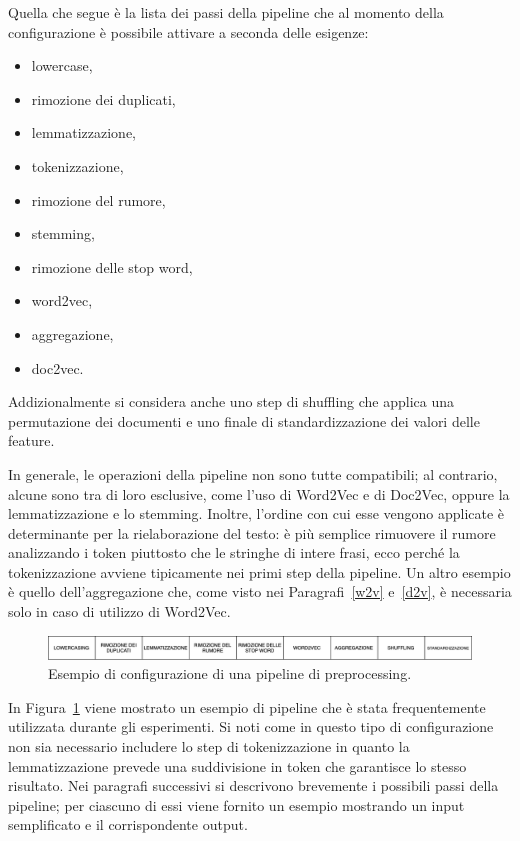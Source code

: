 \documentclass[12pt]{report}
\theoremstyle{definition}
\begin{document}
Quella che segue è la lista dei passi della pipeline che al momento della configurazione è possibile attivare a seconda delle esigenze:
\begin{itemize}
    \item lowercase,
    \item rimozione dei duplicati,
    \item lemmatizzazione,
    \item tokenizzazione,
    \item rimozione del rumore,
    \item stemming,
    \item rimozione delle stop word,
    \item word2vec,
    \item aggregazione,
    \item doc2vec.
\end{itemize}
Addizionalmente si considera anche uno step di shuffling che applica una permutazione dei documenti e uno finale di standardizzazione dei valori delle feature.

In generale, le operazioni della pipeline non sono tutte compatibili; al contrario, alcune sono tra di loro esclusive, come l'uso di Word2Vec e di Doc2Vec, oppure la lemmatizzazione e lo stemming.
Inoltre, l'ordine con cui esse vengono applicate è determinante per la rielaborazione del testo: è più semplice rimuovere il rumore analizzando i token piuttosto che le stringhe di intere frasi, ecco perché la tokenizzazione avviene tipicamente nei primi step della pipeline. Un altro esempio è quello dell'aggregazione che, come visto nei Paragrafi~\ref{w2v} e~\ref{d2v}, è necessaria solo in caso di utilizzo di Word2Vec.
\begin{figure}
    \centering
    \includegraphics[scale=0.395]{images/pipeline.png}
    \caption{Esempio di configurazione di una pipeline di preprocessing.}
    \label{pipeline}
\end{figure}
In Figura~\ref{pipeline} viene mostrato un esempio di pipeline che è stata frequentemente utilizzata durante gli esperimenti. Si noti come in questo tipo di configurazione non sia necessario includere lo step di tokenizzazione in quanto la lemmatizzazione prevede una suddivisione in token che garantisce lo stesso risultato.
Nei paragrafi successivi si descrivono brevemente i possibili passi della pipeline; per ciascuno di essi viene fornito un esempio mostrando un input semplificato e il corrispondente output.
\end{document}
